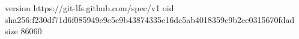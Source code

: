 version https://git-lfs.github.com/spec/v1
oid sha256:f230df71d6f085949e9e5e9b43874335e16dc5ab4018359c9b2ee0315670fdad
size 86060
